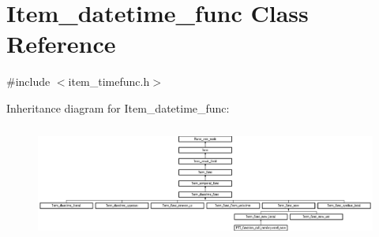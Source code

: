 \hypertarget{classItem__datetime__func}{}\section{Item\+\_\+datetime\+\_\+func Class Reference}
\label{classItem__datetime__func}


{\ttfamily \#include $<$item\+\_\+timefunc.\+h$>$}

Inheritance diagram for Item\+\_\+datetime\+\_\+func\+:\begin{figure}[H]
\begin{center}
\leavevmode
\includegraphics[height=3.766816cm]{classItem__datetime__func}
\end{center}
\end{figure}
